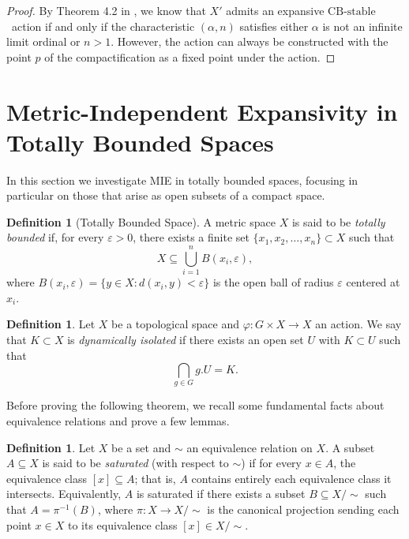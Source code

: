 \documentclass[12pt]{amsart}
\theoremstyle{plain}
\theoremstyle{definition}
\newtheorem{definition}[theorem]{Definition}
\theoremstyle{remark}
\newcommand{\CBstable}{\ensuremath{\mathrm{CB\text{-}stable}}\ }
\begin{document}
\begin{proof}
By Theorem 4.2 in \cite{Ferrari2025}, we know that \(X'\) admits an expansive \CBstable action if and only if the characteristic \((\alpha, n)\) satisfies either \(\alpha\) is not an infinite limit ordinal or \(n > 1\). However, the action can always be constructed with the point \(p\) of the compactification as a fixed point under the action.
\end{proof}





\section{Metric-Independent Expansivity in Totally Bounded Spaces}

\noindent

In this section we investigate MIE in totally bounded spaces, focusing in particular on those that arise as open subsets of a compact space.




\begin{definition}[Totally Bounded Space]
A metric space \(X\) is said to be \emph{totally bounded} if, for every \(\varepsilon > 0\), there exists a finite set \(\{x_1, x_2, \dots, x_n\} \subset X\) such that
\[
X \subseteq \bigcup_{i=1}^{n} B(x_i, \varepsilon),
\]
where \(B(x_i, \varepsilon) = \{y \in X : d(x_i, y) < \varepsilon\}\) is the open ball of radius \(\varepsilon\) centered at \(x_i\).
\end{definition}

\begin{definition}
Let \(X\) be a topological space and \(\varphi : G \times X \rightarrow X\) an action. We say that \(K \subset X\) is \emph{dynamically isolated} if there exists an open set \(U\) with \(K \subset U\) such that
\[
\bigcap_{g \in G} g.U = K.
\]
\end{definition}

Before proving the following theorem, we recall some fundamental facts about equivalence relations and prove a few lemmas.

\begin{definition}
Let \( X \) be a set and \( \sim \) an equivalence relation on \( X \). A subset \( A \subseteq X \) is said to be \emph{saturated} (with respect to \( \sim \)) if for every \( x \in A \), the equivalence class \( [x] \subseteq A \); that is, \( A \) contains entirely each equivalence class it intersects.
Equivalently, \( A \) is saturated if there exists a subset \( B \subseteq X/{\sim} \) such that \( A = \pi^{-1}(B) \), where \( \pi : X \to X/{\sim} \) is the canonical projection sending each point \( x \in X \) to its equivalence class \( [x] \in X/{\sim} \).
\end{definition}
\end{document}

